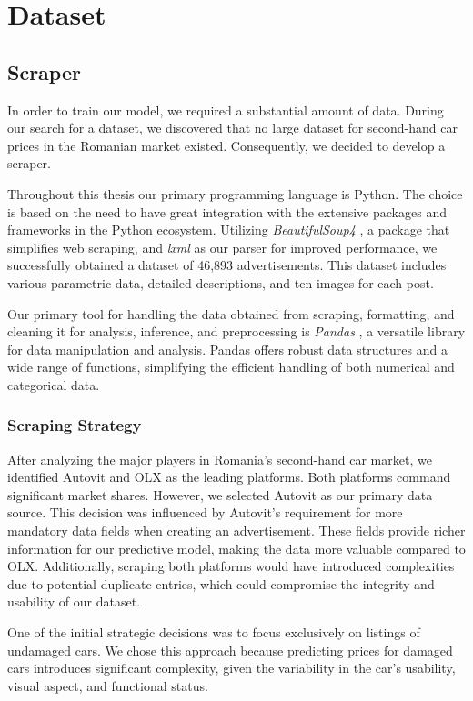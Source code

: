 \chapter{Dataset}

\section{Scraper}

In order to train our model, we required a substantial amount of data. During our search for a dataset, we discovered that no large dataset for second-hand car prices in the Romanian market existed. Consequently, we decided to develop a scraper.

Throughout this thesis our primary programming language is Python. The choice is based on the need to have great integration with the extensive packages and frameworks in the Python ecosystem. Utilizing \textit{BeautifulSoup4} \cite{bs4}, a package that simplifies web scraping, and \textit{lxml} \cite{lxml} as our parser for improved performance, we successfully obtained a dataset of 46,893 advertisements. This dataset includes various parametric data, detailed descriptions, and ten images for each post.

Our primary tool for handling the data obtained from scraping, formatting, and cleaning it for analysis, inference, and preprocessing is \textit{Pandas} \cite{pandas}, a versatile library for data manipulation and analysis. Pandas offers robust data structures and a wide range of functions, simplifying the efficient handling of both numerical and categorical data.

\subsection{Scraping Strategy}

After analyzing the major players in Romania's second-hand car market, we identified Autovit and OLX as the leading platforms. Both platforms command significant market shares. However, we selected Autovit as our primary data source. This decision was influenced by Autovit's requirement for more mandatory data fields when creating an advertisement. These fields provide richer information for our predictive model, making the data more valuable compared to OLX. Additionally, scraping both platforms would have introduced complexities due to potential duplicate entries, which could compromise the integrity and usability of our dataset.

One of the initial strategic decisions was to focus exclusively on listings of undamaged cars. We chose this approach because predicting prices for damaged cars introduces significant complexity, given the variability in the car's usability, visual aspect, and functional status.


